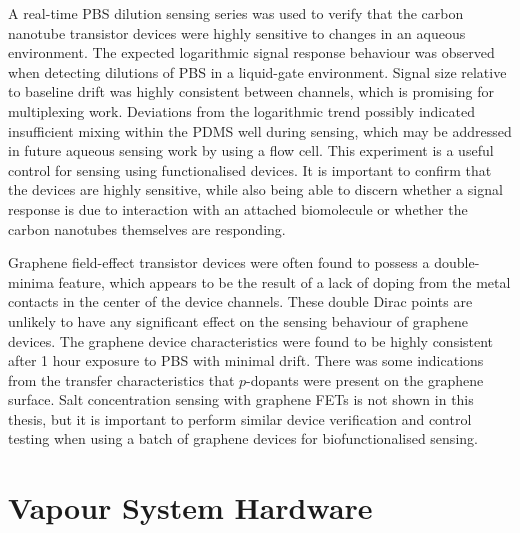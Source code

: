 \documentclass[
  a4paper,
]{scrbook}
\begin{document}
A real-time PBS dilution sensing series was used to verify that the
carbon nanotube transistor devices were highly sensitive to changes in
an aqueous environment. The expected logarithmic signal response
behaviour was observed when detecting dilutions of PBS in a liquid-gate
environment. Signal size relative to baseline drift was highly
consistent between channels, which is promising for multiplexing work.
Deviations from the logarithmic trend possibly indicated insufficient
mixing within the PDMS well during sensing, which may be addressed in
future aqueous sensing work by using a flow cell. This experiment is a
useful control for sensing using functionalised devices. It is important
to confirm that the devices are highly sensitive, while also being able
to discern whether a signal response is due to interaction with an
attached biomolecule or whether the carbon nanotubes themselves are
responding.

Graphene field-effect transistor devices were often found to possess a
double-minima feature, which appears to be the result of a lack of
doping from the metal contacts in the center of the device channels.
These double Dirac points are unlikely to have any significant effect on
the sensing behaviour of graphene devices. The graphene device
characteristics were found to be highly consistent after 1 hour exposure
to PBS with minimal drift. There was some indications from the transfer
characteristics that \(p\)-dopants were present on the graphene surface.
Salt concentration sensing with graphene FETs is not shown in this
thesis, but it is important to perform similar device verification and
control testing when using a batch of graphene devices for
biofunctionalised sensing.

\cleardoublepage
{}
{}
\appendix

\hypertarget{vapour-system-hardware}{%
\chapter{Vapour System Hardware}\label{vapour-system-hardware}}
\end{document}
